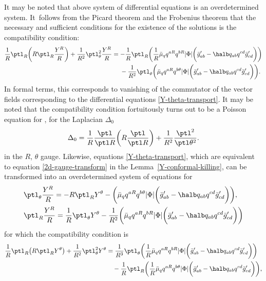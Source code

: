 It may be noted that above system of differential equations is an overdetermined system. It~follows from the Picard theorem and the Frobenius theorem that the necessary and sufficient conditions for the existence of the solutions is the compatibility condition:
\begin{gather*}
\frac{1}{R} \ptl_R \biggl(R \ptl_R \frac{Y^R}{R} \biggr) + \frac{1}{R^2} \ptl^2 _{\theta} \frac{Y^R}{R}=
- \frac{1}{R} \ptl_R \biggl(\frac{1}{R} \bar{\mu}_q q^{aR} q^{bR} \vert \Phi \vert \biggl(\bar{g}'_{ab} - \halb q_{ab} q^{cd} \bar{g}'_{cd}\biggr)\biggr) \notag\\
\hphantom{\frac{1}{R} \ptl_R \biggl(R \ptl_R \frac{Y^R}{R} \biggr) + \frac{1}{R^2} \ptl^2 _{\theta} \frac{Y^R}{R}=}{}
-\frac{1}{R^2} \ptl_ \theta \biggl(\bar{\mu}_q q^{aR} q^{b \theta} \vert \Phi \vert \biggl(\bar{g}'_{ab} - \halb q_{ab} q^{cd} \bar{g}'_{cd}\biggr)\biggr).
\end{gather*}
In formal terms, this corresponds to vanishing of the commutator of the vector fields corresponding to the differential equations \eqref{Y-theta-transport}.
It may be noted that the compatibility condition fortuitously turns out to be a Poisson equation for , for the Laplacian $\Delta_0$
\begin{align*}
\Delta_0 = \frac{1}{R} \frac{\ptl}{ \ptl R} \biggl(R \frac{\ptl }{\ptl R} \biggr) + \frac{1}{R^2} \frac{\ptl^2}{ \ptl \theta^2}.
\end{align*}
in the $R$, $\theta$ gauge. Likewise, equations \eqref{Y-theta-transport}, which are equivalent to equation \eqref{2d-gauge-transform} in the Lemma~\ref{Y-conformal-killing}, can be transformed into an overdetermined system of equations for 
\begin{align*}
&\ptl_\theta \frac{Y^R}{R}= - R \ptl_R Y^\theta - \biggl(\bar{\mu}_q q^{aR} q^{b\theta} \vert \Phi \vert \biggl(\bar{g}'_{ab} - \halb q_{ab} q^{cd} \bar{g}'_{cd}\biggr) \biggr), \\
&\ptl_R \frac{Y^R}{R}= \frac{1}{R} \ptl_\theta Y^\theta - \frac{1}{R^2} \biggl(\bar{\mu}_q q^{aR} q^{bR} \vert \Phi \vert \biggl(\bar{g}'_{ab} - \halb q_{ab} q^{cd} \bar{g}'_{cd}\biggr) \biggr)
\end{align*}
for which the compatibility condition is
\begin{align*}
\frac{1}{R} \ptl_R \bigl(R \ptl_R Y^\theta\bigr) + \frac{1}{R^2} \ptl^2_\theta Y^\theta &{}=
\frac{1}{R^3} \ptl_\theta \biggl(\frac{1}{R} \bar{\mu}_q q^{aR} q^{bR} \vert \Phi \vert \biggl(\bar{g}'_{ab} - \halb q_{ab} q^{cd} \bar{g}'_{cd}\biggr)\biggr) \notag\\
&\quad{}- \frac{1}{R} \ptl_R \biggl(\frac{1}{R} \bar{\mu}_q q^{aR} q^{b\theta} \vert \Phi \vert \biggl(\bar{g}'_{ab} - \halb q_{ab} q^{cd} \bar{g}'_{cd}\biggr)\biggr),
 \end{align*}
